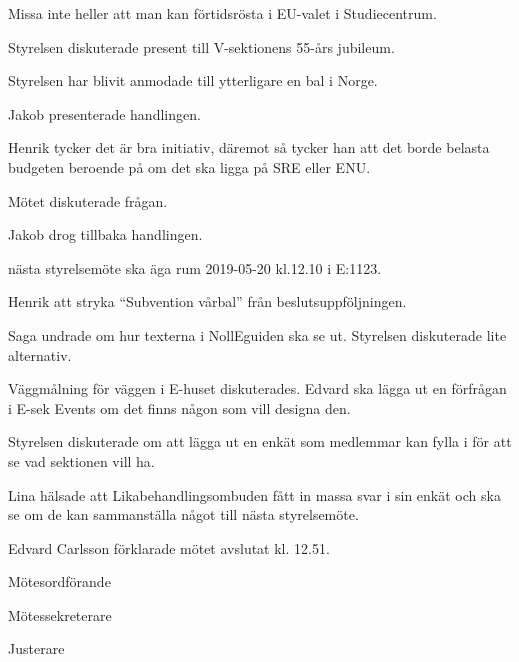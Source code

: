 \documentclass[10pt]{article}
\def\mo{Edvard Carlsson}
\def\ms{Sonja Kenari}
\def\ji{Theo Nyman}
\begin{document}
\begin{paragrafer}
\begin{paragrafer}
Missa inte heller att man kan förtidsrösta i EU-valet i Studiecentrum.

Styrelsen diskuterade present till V-sektionens 55-års jubileum.

Styrelsen har blivit anmodade till ytterligare en bal i Norge.

\end{paragrafer}

Jakob presenterade handlingen. 

Henrik tycker det är bra initiativ, däremot så tycker han att det borde belasta budgeten beroende på om det ska ligga på SRE eller ENU.

Mötet diskuterade frågan.

Jakob drog tillbaka handlingen. 

\Mba nästa styrelsemöte ska äga rum 2019-05-20 kl.12.10 i E:1123.

Henrik \ypa att stryka ``Subvention vårbal'' från beslutsuppföljningen.

\Mbaby

Saga undrade om hur texterna i NollEguiden ska se ut. Styrelsen diskuterade lite alternativ. 

Väggmålning för väggen i E-huset diskuterades. Edvard ska lägga ut en förfrågan i E-sek Events om det finns någon som vill designa den.

Styrelsen diskuterade om att lägga ut en enkät som medlemmar kan fylla i för att se vad sektionen vill ha. 

Lina hälsade att Likabehandlingsombuden fått in massa svar i sin enkät och ska se om de kan sammanställa något till nästa styrelsemöte.
 
{\mo} förklarade mötet avslutat kl. 12.51.
\end{paragrafer}

\hidesignfoot
\begin{signatures}{3}
\signature{\mo}{Mötesordförande}
\signature{\ms}{Mötessekreterare}
\signature{\ji}{Justerare}
\end{signatures}
\end{document}
